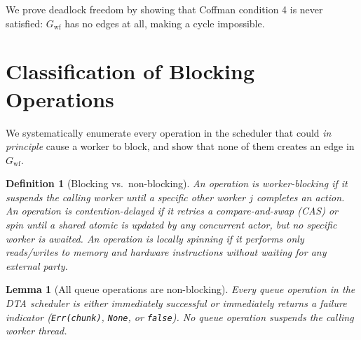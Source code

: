 \documentclass[11pt,a4paper]{report}
\newtheorem{lemma}[theorem]{Lemma}
\newtheorem{definition}{Definition}[section]
\newcommand{\code}[1]{\texttt{#1}}
\begin{document}
We prove deadlock freedom by showing that Coffman condition 4 is
never satisfied: $G_{\text{wf}}$ has no edges at all, making a
cycle impossible.

\section{Classification of Blocking Operations}

We systematically enumerate every operation in the scheduler that
could \emph{in principle} cause a worker to block, and show that none
of them creates an edge in $G_{\text{wf}}$.

\begin{definition}[Blocking vs.\ non-blocking]
An operation is \emph{worker-blocking} if it suspends the calling
worker until a \emph{specific other worker} $j$ completes an action.
An operation is \emph{contention-delayed} if it retries a
compare-and-swap (CAS) or spin until a shared atomic is updated by
\emph{any} concurrent actor, but no specific worker is awaited.
An operation is \emph{locally spinning} if it performs only
reads/writes to memory and hardware instructions without waiting for
any external party.
\end{definition}

\begin{lemma}[All queue operations are non-blocking]
\label{lem:nonblocking}
Every queue operation in the DTA scheduler is either immediately
successful or immediately returns a failure indicator
(\code{Err(chunk)}, \code{None}, or \code{false}).
No queue operation suspends the calling worker thread.
\end{lemma}
\end{document}
